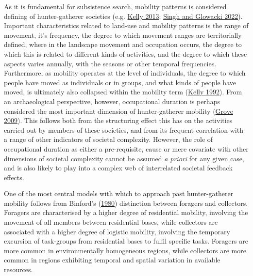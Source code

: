 \documentclass[
  12pt,
  a4paper,
  oneside]{book}
\begin{document}
As it is fundamental for subsistence search, mobility patterns is considered defining of hunter-gatherer societies (e.g. \protect\hyperlink{ref-kelly2013}{Kelly 2013}; \protect\hyperlink{ref-singh2022}{Singh and Glowacki 2022}). Important characteristics related to land-use and mobility patterns is the range of movement, it's frequency, the degree to which movement ranges are territorially defined, where in the landscape movement and occupation occurs, the degree to which this is related to different kinds of activities, and the degree to which these aspects varies annually, with the seasons or other temporal frequencies. Furthermore, as mobility operates at the level of individuals, the degree to which people have moved as individuals or in groups, and what kinds of people have moved, is ultimately also collapsed within the mobility term (\protect\hyperlink{ref-kelly1992}{Kelly 1992}). From an archaeological perspective, however, occupational duration is perhaps considered the most important dimension of hunter-gatherer mobility (\protect\hyperlink{ref-grove2009}{Grove 2009}). This follows both from the structuring effect this has on the activities carried out by members of these societies, and from its frequent correlation with a range of other indicators of societal complexity. However, the role of occupational duration as either a pre-requisite, cause or mere covariate with other dimensions of societal complexity cannot be assumed \emph{a priori} for any given case, and is also likely to play into a complex web of interrelated societal feedback effects.

One of the most central models with which to approach past hunter-gatherer mobility follows from Binford's (\protect\hyperlink{ref-binford1980}{1980}) distinction between foragers and collectors. Foragers are characterised by a higher degree of residential mobility, involving the movement of all members between residential bases, while collectors are associated with a higher degree of logistic mobility, involving the temporary excursion of task-groups from residential bases to fulfil specific tasks. Foragers are more common in environmentally homogeneous regions, while collectors are more common in regions exhibiting temporal and spatial variation in available resources.
\end{document}
